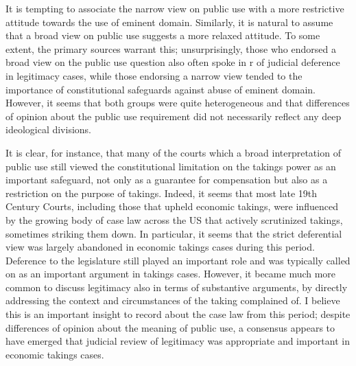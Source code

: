 
It is tempting to associate the narrow view on public use with a more restrictive attitude towards the use of eminent domain. Similarly, it is natural to assume that a broad view on public use suggests a more relaxed attitude. To some extent, the primary sources warrant this; unsurprisingly, those who endorsed a broad view on the public use question also often spoke in r of judicial deference in legitimacy cases, while those endorsing a narrow view tended to  the importance of constitutional safeguards against abuse of eminent domain. However, it seems that both groups were quite heterogeneous and that differences of opinion about the public use requirement did not necessarily reflect any deep ideological divisions.

It is clear, for instance, that many of the courts which  a broad interpretation of public use still viewed the constitutional limitation on the takings power as an important safeguard, not only as a guarantee for compensation but also as a restriction on the purpose of takings. Indeed, it seems that most late 19th Century Courts, including those that upheld economic takings, were influenced by the growing body of case law across the US that actively scrutinized takings, sometimes striking them down. In particular, it seems that the strict deferential view was largely abandoned in economic takings cases during this period. Deference to the legislature still played an important role and was typically called on as an important argument in takings cases. However, it became much more common to discuss legitimacy also in terms of substantive arguments, by directly addressing the context and circumstances of the taking complained of. I believe this is an important insight to record about the case law from this period; despite differences of opinion about the meaning of public use, a consensus appears to have emerged that judicial review of legitimacy was appropriate and important in economic takings cases.

